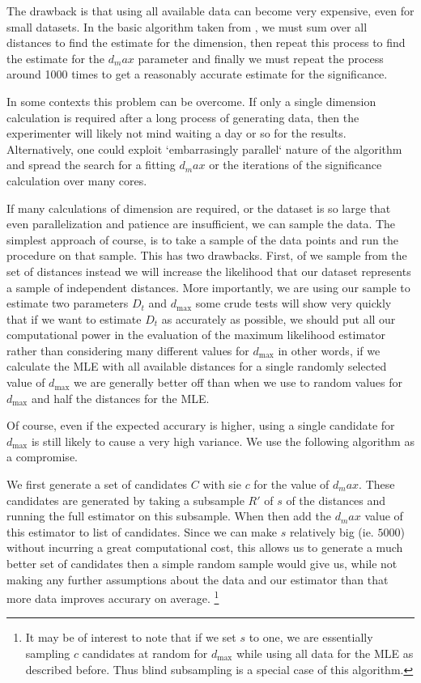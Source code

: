 \documentclass[11pt]{article}
\begin{document}
The drawback is that using all available data can become very expensive, even for small datasets. In the basic algorithm taken from \cite{clauset2007power}, we must sum over all distances to find the estimate for the dimension, then repeat this process to find the estimate for the $d_max$ parameter and finally we must repeat the process around 1000 times to get a reasonably accurate estimate for the significance.

In some contexts this problem can be overcome. If only a single dimension calculation is required after a long process of generating data, then the experimenter will likely not mind waiting a day or so for the results. Alternatively, one could exploit `embarrasingly parallel` nature of the algorithm and spread the search for a fitting $d_max$ or the iterations of the significance calculation over many cores.

If many calculations of dimension are required, or the dataset is so large that even parallelization and patience are insufficient, we can sample the data. The simplest approach of course, is to take a sample of the data points and run the procedure on that sample. This has two drawbacks. First, of we sample from the set of distances instead we will increase the likelihood that our dataset represents a sample of independent distances. More importantly, we are using our sample to estimate two parameters $D_t$ and $d_{\max}$ some crude tests will show very quickly that if we want to estimate $D_t$ as accurately as possible, we should put all our computational power in the evaluation of the maximum likelihood estimator rather than considering many different values for $d_{\max}$ in other words, if we calculate the MLE with all available distances for a single randomly selected value of $d_{\max}$ we are generally better off than when we use to random values for $d_{\max}$ and half the distances for the MLE. 

Of course, even if the expected accurary is higher, using a single candidate for $d_{\max}$ is still likely to cause a very high variance. We use the following algorithm as a compromise.

We first generate a set of candidates $C$ with sie $c$ for the value of $d_max$. These candidates are generated by taking a subsample $R'$ of $s$ of the distances and running the full estimator on this subsample. When then add the $d_max$ value of this estimator to list of candidates. Since we can make $s$ relatively big (ie. $5000$) without incurring a great computational cost, this allows us to generate a much better set of candidates then a simple random sample would give us, while not making any further assumptions about the data and our estimator than that more data improves accurary on average. \footnote{It may be of interest to note that if we set $s$ to one, we are essentially sampling $c$ candidates at random for $d_{\max}$ while using all data for the MLE as described before. Thus blind subsampling is a special case of this algorithm.}
\end{document}
